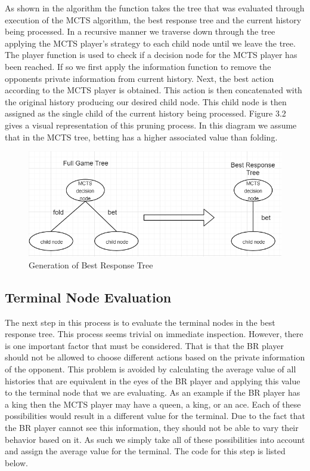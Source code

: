 As shown in the algorithm the function takes the tree that was evaluated
through execution of the MCTS algorithm, the best response tree and the current history being processed.
In a recursive manner we traverse down through the tree applying the MCTS player's
strategy to each child node until we leave the tree.
The player function is used to check if a decision node for the MCTS player has been reached.
If so we first apply the information function to remove the opponents private information from current history.
Next, the best action according to the MCTS player is obtained.
This action is then concatenated with the original history producing our desired child node.
This child node is then assigned as the single child of the current history being processed.
Figure 3.2 gives a visual representation of this pruning process.
In this diagram we assume that in the MCTS tree, betting has a higher associated value than folding.

\begin{figure}[!ht]
    \includegraphics[scale=1]{images/best_response_tree_vs_full_tree.PNG}
    \caption{Generation of Best Response Tree}
\end{figure}

\subsection{Terminal Node Evaluation}\label{subsec:terminalNodeEvaluation}
The next step in this process is to evaluate the terminal nodes in the best response tree.
This process seems trivial on immediate inspection.
However, there is one important factor that must be considered.
That is that the BR player should not be allowed to choose different actions based on the
private information of the opponent.
This problem is avoided by calculating the average value of all histories that are equivalent in
the eyes of the BR player and applying this value to the terminal node that we are evaluating.
As an example if the BR player has a king then the MCTS player may have a queen, a king, or an ace.
Each of these possibilities would result in a different value for the terminal.
Due to the fact that the BR player cannot see this information, they should not be able to vary
their behavior based on it.
As such we simply take all of these possibilities into account and assign the average value for
the terminal.
The code for this step is listed below.

